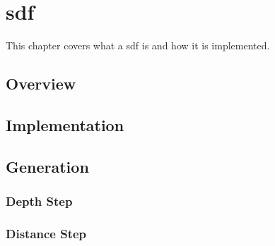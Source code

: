 \chapter{\acf{sdf}}
This chapter covers what a \ac{sdf} is and how it is implemented.

\section{Overview}


\section{Implementation}

\section{Generation}
    \subsection{Depth Step}
    \subsection{Distance Step}
